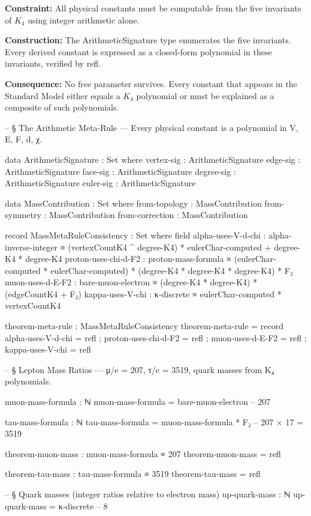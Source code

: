 \documentclass[11pt,a4paper]{book}
\def\texttt#1{#1}%
\begin{document}
\textbf{Constraint:} All physical constants must be computable from the five invariants of $K_4$ using integer arithmetic alone.

\textbf{Construction:} The \texttt{ArithmeticSignature} type enumerates the five invariants. Every derived constant is expressed as a closed-form polynomial in these invariants, verified by \texttt{refl}.

\textbf{Consequence:} No free parameter survives. Every constant that appears in the Standard Model either equals a $K_4$ polynomial or must be explained as a composite of such polynomials.

\begin{code}
-- § The Arithmetic Meta-Rule — Every physical constant is a polynomial in {V, E, F, d, χ}.

data ArithmeticSignature : Set where
  vertex-sig  : ArithmeticSignature
  edge-sig    : ArithmeticSignature
  face-sig    : ArithmeticSignature
  degree-sig  : ArithmeticSignature
  euler-sig   : ArithmeticSignature

data MassContribution : Set where
  from-topology   : MassContribution
  from-symmetry   : MassContribution
  from-correction : MassContribution

record MassMetaRuleConsistency : Set where
  field
    alpha-uses-V-d-chi : alpha-inverse-integer ≡ (vertexCountK4 ^ degree-K4) * eulerChar-computed + degree-K4 * degree-K4
    proton-uses-chi-d-F2 : proton-mass-formula ≡ (eulerChar-computed * eulerChar-computed) * (degree-K4 * degree-K4 * degree-K4) * F₂
    muon-uses-d-E-F2 : bare-muon-electron ≡ (degree-K4 * degree-K4) * (edgeCountK4 + F₂)
    kappa-uses-V-chi : κ-discrete ≡ eulerChar-computed * vertexCountK4

theorem-meta-rule : MassMetaRuleConsistency
theorem-meta-rule = record
  { alpha-uses-V-d-chi = refl
  ; proton-uses-chi-d-F2 = refl
  ; muon-uses-d-E-F2 = refl
  ; kappa-uses-V-chi = refl }

-- § Lepton Mass Ratios — μ/e = 207, τ/e = 3519, quark masses from K₄ polynomials.

muon-mass-formula : ℕ
muon-mass-formula = bare-muon-electron  -- 207

tau-mass-formula : ℕ
tau-mass-formula = muon-mass-formula * F₂  -- 207 × 17 = 3519

theorem-muon-mass : muon-mass-formula ≡ 207
theorem-muon-mass = refl

theorem-tau-mass : tau-mass-formula ≡ 3519
theorem-tau-mass = refl

-- § Quark masses (integer ratios relative to electron mass)
up-quark-mass : ℕ
up-quark-mass = κ-discrete  -- 8


\end{code}
\end{document}
